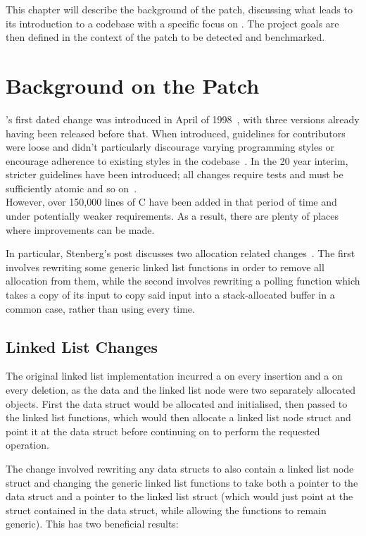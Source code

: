 This chapter will describe the background of the patch, discussing what leads to its introduction to a codebase with a specific focus on . The project goals are then defined in the context of the patch to be detected and benchmarked.

\section{Background on the Patch}\label{backgroundsec}

's first dated change was introduced in April of 1998~\cite{curlrelease}, with three versions already having been released before that. When introduced, guidelines for contributors were loose and didn't particularly discourage varying programming styles or encourage adherence to existing styles in the codebase~\cite{curlcontribute1999}. In the 20 year interim, stricter guidelines have been introduced; all changes require tests and must be sufficiently atomic and so on~\cite{curlcontribute2017}.\\
However, over 150,000 lines of C have been added in that period of time and under potentially weaker requirements. As a result, there are plenty of places where improvements can be made.

In particular, Stenberg's post discusses two allocation related changes~\cite{curlmalloc}. The first involves rewriting some generic linked list functions in order to remove all allocation from them, while the second involves rewriting a polling function which takes a copy of its input to copy said input into a stack-allocated buffer in a common case, rather than using \malloc{} every time.

\subsection{Linked List Changes}

The original linked list implementation incurred a \malloc{} on every insertion and a \free{} on every deletion, as the data and the linked list node were two separately allocated objects. First the data struct would be allocated and initialised, then passed to the linked list functions, which would then allocate a linked list node struct and point it at the data struct before continuing on to perform the requested operation.

The change involved rewriting any data structs to also contain a linked list node struct and changing the generic linked list functions to take both a pointer to the data struct and a pointer to the linked list struct (which would just point at the struct contained in the data struct, while allowing the functions to remain generic). This has two beneficial results:

